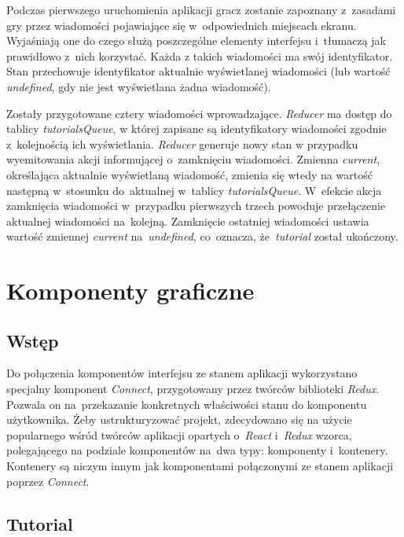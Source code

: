 \documentclass[12pt,a4paper,polish,thesis]{dcsbook}
\begin{document}
{	Podczas pierwszego uruchomienia aplikacji gracz zostanie zapoznany z~zasadami gry przez wiadomości pojawiające się w~odpowiednich miejscach ekranu. Wyjaśniają one do czego służą poszczególne elementy interfejsu i~tłumaczą jak prawidłowo z~nich korzystać. Każda z takich wiadomości ma swój identyfikator. Stan przechowuje identyfikator aktualnie wyświetlanej wiadomości (lub wartość \textit{undefined}, gdy nie jest wyświetlana żadna wiadomość).
	
	Zostały przygotowane cztery wiadomości wprowadzające. \textit{Reducer} ma dostęp do tablicy \textit{tutorialsQueue}, w której zapisane są identyfikatory wiadomości zgodnie z~kolejnością ich wyświetlania. \textit{Reducer} generuje nowy stan w przypadku wyemitowania akcji informującej o~zamknięciu wiadomości. Zmienna \textit{current}, określająca aktualnie wyświetlaną wiadomość, zmienia się wtedy na wartość następną w~stosunku do~aktualnej w~tablicy \textit{tutorialsQueue}. W~efekcie akcja zamknięcia wiadomości w~przypadku pierwszych trzech powoduje przełączenie aktualnej wiadomości na~kolejną. Zamknięcie ostatniej wiadomości ustawia wartość zmiennej \textit{current} na~\textit{undefined}, co~oznacza, że~\textit{tutorial} został ukończony.

	\section{Komponenty graficzne}

	\subsection{Wstęp}

	Do połączenia komponentów interfejsu ze stanem aplikacji wykorzystano specjalny komponent \textit{Connect}, przygotowany przez twórców biblioteki \textit{Redux}. Pozwala on na~przekazanie konkretnych właściwości stanu do komponentu użytkownika. Żeby ustrukturyzować projekt, zdecydowano się na użycie popularnego wśród twórców aplikacji opartych o~\textit{React} i~\textit{Redux} wzorca, polegającego na podziale komponentów na~dwa typy: komponenty i~kontenery. Kontenery są niczym innym jak komponentami połączonymi ze stanem aplikacji poprzez \textit{Connect}.

	\subsection{Tutorial}

}
\end{document}
